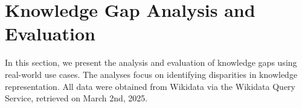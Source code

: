 \section{Knowledge Gap Analysis and Evaluation}


In this section, we present the analysis and evaluation of knowledge gaps using real-world use cases. The analyses focus on identifying disparities in knowledge representation. All data were obtained from Wikidata via the Wikidata Query Service, retrieved on March 2nd, 2025.












